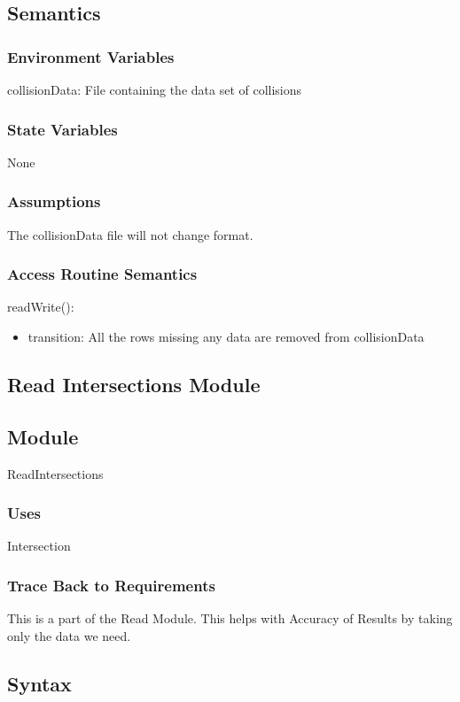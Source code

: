 \documentclass[12pt]{article}
\begin{document}
\subsection*{Semantics}
\subsubsection*{Environment Variables}
collisionData: File containing the data set of collisions

\subsubsection*{State Variables}
None

\subsubsection*{Assumptions}
The collisionData file will not change format.

\subsubsection*{Access Routine Semantics}

readWrite():
\begin{itemize}
    \item transition: All the rows missing any data are removed from collisionData
\end{itemize}

\newpage
\subsection{Read Intersections Module}
\subsection*{Module}
ReadIntersections

\subsubsection*{Uses}
Intersection

\subsubsection*{Trace Back to Requirements}
This is a part of the Read Module. This helps with Accuracy of Results by taking only the data we need.

\subsection*{Syntax}
\end{document}
